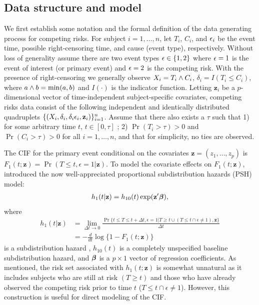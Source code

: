 \subsection{Data structure and model}
\label{s3:estimator}
We first establish some notation and the formal definition of the data generating process for competing risks. 
For subject $i = 1, \ldots, n$, let $T_i$, $C_i$, and $\epsilon_i$ be the event time, possible right-censoring time, and cause (event type), respectively. Without loss of generality assume there are two event types $\epsilon \in \{1, 2\}$ where $\epsilon = 1$ is the event of interest (or primary event) and $\epsilon = 2$ is the competing risk. With the presence of right-censoring we generally observe $X_i = T_i \wedge C_i$, $\delta_i = I(T_i \leq C_i)$, where $a \wedge b = \min(a, b)$ and $I(\cdot)$ is the indicator function. Letting $\mathbf{z}_i$ be a $p$-dimensional vector of time-independent subject-specific covariates, competing risks data consist of the following independent and identically distributed quadruplets $\{(X_i, \delta_i, \delta_i \epsilon_i, \mathbf{z}_i)\}_{i=1}^n$. Assume that there also exists a $\tau$ such that  1) for some arbitrary time $t$, $t \in [0, \tau]$ ; 2) $\Pr(T_i > \tau) > 0$ and $\Pr(C_i > \tau) >0$  for all $i = 1,\ldots, n$, and that for simplicity, no ties are observed.

The CIF for the primary event  conditional on the covariates $\mathbf{z} = (z_1, \ldots, z_p)$ is $F_1(t; \mathbf{z}) = \Pr(T \leq t, \epsilon = 1|\mathbf{z})$.  To model the covariate effects on $F_1(t; \mathbf{z})$, \cite{fine1999proportional} introduced the now well-appreciated proportional subdistribution hazards (PSH) model: 
\begin{align}
\label{eq3:pshmodel}
h_1(t| \mathbf{z}) = h_{10}(t) \exp(\mathbf{z}^\prime\bm \beta),
\end{align}
where \begin{align*}
h_1(t| \mathbf{z}) & =  \lim_{\Delta t \to 0} \frac{\Pr\{t \leq T \leq t + \Delta t, \epsilon = 1 | T \geq t \cup (T \leq t \cap \epsilon \neq 1), \mathbf{z}\}}{\Delta t} %
\\&  = -\frac{d}{dt} \log\{1 - F_1(t; \mathbf{z})\}
\end{align*}
is a subdistribution hazard \citep{gray1988class}, 
$h_{10}(t)$ is a completely unspecified baseline subdistribution hazard, and $\bm \beta$ is a $p \times 1$ vector of regression coefficients. 
As \cite{fine1999proportional} mentioned, the risk set associated with $h_1(t; \mathbf{z})$ is somewhat 
unnatural as it includes subjects who are still at risk $(T \geq t)$ and those who have already observed the competing risk prior to time $t$ ($T \leq t \cap \epsilon \neq 1$). However, this construction is useful  for direct modeling of the CIF.

